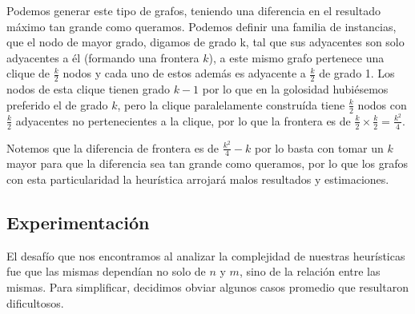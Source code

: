 Podemos generar este tipo de grafos, teniendo una diferencia en el resultado máximo tan grande como queramos. Podemos definir una familia de instancias, que el nodo de mayor grado, digamos de grado k, tal que sus adyacentes son solo adyacentes a él (formando una frontera $k$), a este mismo grafo pertenece una clique de $\frac{k}{2}$ nodos y cada uno de estos además es adyacente a $\frac{k}{2}$ de grado 1. Los nodos de esta clique tienen grado $k - 1$ por lo que en la golosidad hubiésemos preferido el de grado $k$, pero la clique paralelamente construída tiene $\frac{k}{2}$ nodos con $\frac{k}{2}$ adyacentes no pertenecientes a la clique, por lo que la frontera es de $\frac{k}{2} \times \frac{k}{2} = \frac{k^2}{4}$.

Notemos que la diferencia de frontera es de $\frac{k^2}{4} - k$ por lo basta con tomar un $k$ mayor para que la diferencia sea tan grande como queramos, por lo que los grafos con esta particularidad la heurística arrojará malos resultados y estimaciones.

\subsection{Experimentación}

El desafío que nos encontramos al analizar la complejidad de nuestras heurísticas fue que las mismas dependían no solo de $n$ y $m$, sino de la relación entre las mismas. Para simplificar, decidimos obviar algunos casos promedio que resultaron dificultosos.

